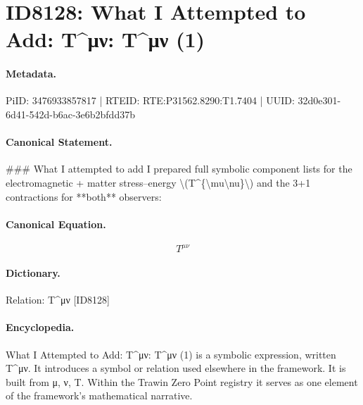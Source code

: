 \section*{ID8128: What I Attempted to Add: T\textasciicircum{}μν: T\textasciicircum{}μν (1)}
\paragraph{Metadata.}
PiID: 3476933857817 | RTEID: RTE:P31562.8290:T1.7404 | UUID: 32d0e301-6d41-542d-b6ac-3e6b2bfdd37b

\paragraph{Canonical Statement.}
\#\#\# What I attempted to add I prepared full symbolic component lists for the electromagnetic + matter stress–energy \textbackslash{}(T\textasciicircum{}\{\textbackslash{}mu\textbackslash{}nu\}\textbackslash{}) and the 3+1 contractions for **both** observers:

\paragraph{Canonical Equation.}
\[
T^{\mu\nu}
\]

\paragraph{Dictionary.}
Relation: T\textasciicircum{}μν [ID8128]

\paragraph{Encyclopedia.}
What I Attempted to Add: T\textasciicircum{}μν: T\textasciicircum{}μν (1) is a symbolic expression, written T\textasciicircum{}μν. It introduces a symbol or relation used elsewhere in the framework. It is built from μ, ν, T. Within the Trawin Zero Point registry it serves as one element of the framework's mathematical narrative.
